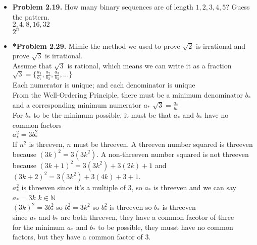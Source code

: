 \documentclass[11pt]{article}
\begin{document}
\begin{itemize}
\vspace{0.1in}

\item \textbf{Problem 2.19.}
  How many binary sequences are of length $1,2,3,4,5$?
  Guess the pattern.
\\$2,4,8,16,32$
\\$2^n$

\vspace{0.1in}

\item \textbf{*Problem 2.29.}
  Mimic the method we used to prove $\sqrt{2}$ is irrational and
  prove $\sqrt{3}$ is irrational.
\\Assume that $\sqrt{3}$ is rational, which means we can write it as a fraction 
\\$\sqrt{3}=\{\frac{a_{1}}{b_{1}},\frac{a_{2}}{b_{2}},\frac{a_{3}}{b_{3}},...\}$
\\Each numerator is unique; and each denominator is unique
\\From the Well-Ordering Principle, there must be a minimum denominator $b_{*}$ 
\\and a corresponding minimum numerator $a_{*}$ \qquad $\sqrt{3}=\frac{a_{*}}{b_{*}}$
\\For $b_{*}$ to be the minimum possible, it must be that $a_{*}$ and $b_{*}$ have no common factors
\\$a_{*}^2=3b_{*}^2$
\\If $n^2$ is threeven, $n$ must be threeven. A threeven number squared is threeven because $(3k)^2=3(3k^2)$. A non-threeven number squared is not threeven because $(3k+1)^2=3(3k^2)+3(2k)+1$ and $(3k+2)^2=3(3k^2)+3(4k)+3+1$.
\\$a_{*}^2$ is threeven since it's a multiple of 3, so $a_{*}$ is threeven and we can say $a_{*}=3k$ \qquad $k\in \mathbb{N}$
\\$(3k)^2=3b_{*}^2$ so $b_{*}^2=3k^2$ so $b_{*}^2$ is threeven so $b_{*}$ is threeven
\\since $a_{*}$ and $b_{*}$ are both threeven, they have a common facotor of three
\\for the minimum $a_{*}$ and $b_{*}$ to be possible, they musst have no common factors, but they have a common factor of 3.


\end{itemize}
\end{document}
